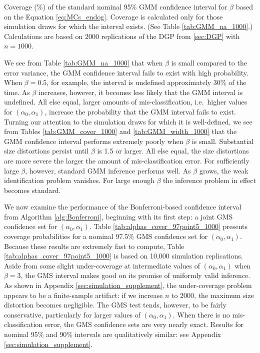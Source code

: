 \begin{table}[htbp]
  \small
  \centering
  
  \caption{Coverage (\%) of the standard nominal 95\% GMM confidence interval for $\beta$ based on the Equation \ref{eq:MCs_endog}. Coverage is calculated only for those simulation draws for which the interval exists. (See Table \ref{tab:GMM_na_1000}.) Calculations are based on 2000 replications of the DGP from \ref{sec:DGP} with $n = 1000$.} 
  \label{tab:GMM_cover_1000}
\end{table}


We see from Table \ref{tab:GMM_na_1000} that when $\beta$ is small compared to the error variance, the GMM confidence interval fails to exist with high probability.
When $\beta = 0.5$, for example, the interval is undefined approximately 30\% of the time.
As $\beta$ increases, however, it becomes less likely that the GMM interval is undefined.
All else equal, larger amounts of mis-classification, i.e.\ higher values for $(\alpha_0, \alpha_1)$, increase the probability that the GMM interval fails to exist.
Turning our attention to the simulation draws for which it is well-defined, we see from Tables \ref{tab:GMM_cover_1000} and \ref{tab:GMM_width_1000} that the GMM confidence interval performs extremely poorly when $\beta$ is small.
Substantial size distortions persist until $\beta$ is 1.5 or larger.
All else equal, the size distortions are more severe the larger the amount of mis-classification error.
For sufficiently large $\beta$, however, standard GMM inference performs well.
As $\beta$ grows, the weak identification problem vanishes.
For large enough $\beta$ the inference problem in effect becomes standard.

We now examine the performance of the Bonferroni-based confidence interval from Algorithm \ref{alg:Bonferroni}, beginning with its first step: a joint GMS confidence set for $(\alpha_0, \alpha_1)$.
Table \ref{tab:alphas_cover_97point5_1000} presents coverage probabilities for a nominal 97.5\% GMS confidence set for $(\alpha_0, \alpha_1)$.
Because these results are extremely fast to compute, Table \ref{tab:alphas_cover_97point5_1000} is based on 10,000 simulation replications. 
Aside from some slight under-coverage at intermediate values of $(\alpha_0, \alpha_1)$ when $\beta = 3$, the GMS interval makes good on its promise of uniformly valid inference.
As shown in Appendix \ref{sec:simulation_supplement}, the under-coverage problem appears to be a finite-sample artifact: if we increase $n$ to 2000, the maximum size distortion becomes negligible.
The GMS test tends, however, to be fairly conservative, particularly for larger values of $(\alpha_0, \alpha_1)$.
When there is no mis-classification error, the GMS confidence sets are very nearly exact.
Results for nominal 95\% and 90\% intervals are qualitatively similar: see Appendix \ref{sec:simulation_supplement}.


